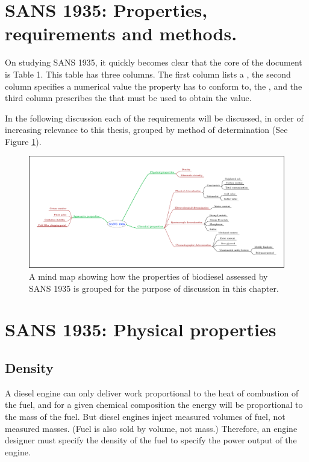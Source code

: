 \section{SANS 1935: Properties, requirements and methods.}

On studying SANS 1935, it quickly becomes clear that the core of the document
is Table 1. This table has three columns. The first column lists a
, the second column specifies a numerical value the property
has to conform to, the , and the third column prescribes
the  that must be used to obtain the value.

In the following discussion each of the requirements will be discussed, in order
of increasing relevance to this thesis, grouped by method of determination (See
Figure \ref{fig:MindMap}).


\begin{figure}
\centering
\includegraphics[width=\textwidth]{Figures/SANS1935.pdf}
\decoRule

\caption[Discussion of SANS 1935.]{A mind map showing how the properties of
biodiesel assessed by SANS 1935 is grouped for the purpose of discussion in this
chapter.}

\label{fig:MindMap}
\end{figure}

\section{SANS 1935: Physical properties}

\subsection{Density}

A diesel engine can only deliver work proportional to the heat of combustion of
the fuel, and for a given chemical composition the energy will be proportional
to the mass of the fuel. But diesel engines inject measured volumes of fuel, not
measured masses. (Fuel is also sold by volume, not mass.) Therefore, an engine
designer must specify the density of the fuel to specify the power output of the
engine.

